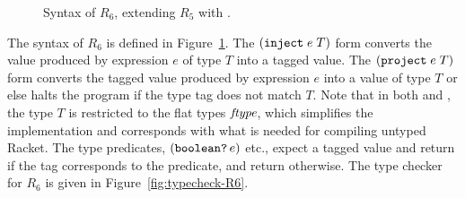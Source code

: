 \documentclass[11pt]{book}
\newcommand{\gray}[1]{{\color{lightgray} #1}}
\begin{document}
\begin{figure}[tp]
\centering
\fbox{
\begin{minipage}{0.97\textwidth}
\[
\begin{array}{lcl}
  \Type &::=& \gray{\key{Integer} \mid \key{Boolean}
     \mid (\key{Vector}\;\Type^{+}) \mid (\key{Vectorof}\;\Type) \mid \key{Void}} \\
    &\mid& \gray{(\Type^{*} \; \key{->}\; \Type)} \mid \key{Any} \\
  \FType &::=& \key{Integer} \mid \key{Boolean} \mid (\key{Vectorof}\;\key{Any})
     \mid (\key{Any}^{*} \; \key{->}\; \key{Any})\\
  \itm{cmp} &::= & \key{eq?} \mid \key{<} \mid \key{<=} \mid \key{>} \mid \key{>=} \\
  \Exp &::=& \gray{\Int \mid (\key{read}) \mid (\key{-}\;\Exp)
     \mid (\key{+} \; \Exp\;\Exp)}  \\
    &\mid&  \gray{\Var \mid \LET{\Var}{\Exp}{\Exp}} \\
    &\mid& \gray{\key{\#t} \mid \key{\#f} \mid
           (\key{and}\;\Exp\;\Exp) \mid (\key{not}\;\Exp)} \\
    &\mid& \gray{(\itm{cmp}\;\Exp\;\Exp) \mid \IF{\Exp}{\Exp}{\Exp}} \\
    &\mid& \gray{(\key{vector}\;\Exp^{+}) \mid
          (\key{vector-ref}\;\Exp\;\Int)} \\
    &\mid& \gray{(\key{vector-set!}\;\Exp\;\Int\;\Exp)\mid (\key{void})} \\
    &\mid& \gray{(\Exp \; \Exp^{*})
    \mid (\key{lambda:}\; ([\Var \key{:} \Type]^{*}) \key{:} \Type \; \Exp)} \\
  & \mid & (\key{inject}\; \Exp \; \FType) \mid (\key{project}\;\Exp\;\FType) \\
  & \mid & (\key{boolean?}\;\Exp) \mid (\key{integer?}\;\Exp)\\
  & \mid & (\key{vector?}\;\Exp) \mid (\key{procedure?}\;\Exp) \mid (\key{void?}\;\Exp) \\
  \Def &::=& \gray{(\key{define}\; (\Var \; [\Var \key{:} \Type]^{*}) \key{:} \Type \; \Exp)} \\
  R_6 &::=& \gray{(\key{program} \; \Def^{*} \; \Exp)}
\end{array}
\]
\end{minipage}
}
\caption{Syntax of $R_6$, extending $R_5$ with .}
\label{fig:r6-syntax}
\end{figure}

The syntax of $R_6$ is defined in Figure~\ref{fig:r6-syntax}.  The
$(\texttt{inject}\; e\; T)$ form converts the value produced by
expression $e$ of type $T$ into a tagged value.  The
$(\texttt{project}\;e\;T)$ form converts the tagged value produced by
expression $e$ into a value of type $T$ or else halts the program if
the type tag does not match $T$. Note that in both  and
, the type $T$ is restricted to the flat types $\mathit{ftype}$,
which simplifies the implementation and corresponds with what is
needed for compiling untyped Racket. The type predicates,
$(\texttt{boolean?}\,e)$ etc., expect a tagged value and return 
if the tag corresponds to the predicate, and return 
otherwise.
%
The type checker for $R_6$ is given in Figure~\ref{fig:typecheck-R6}.
\end{document}
